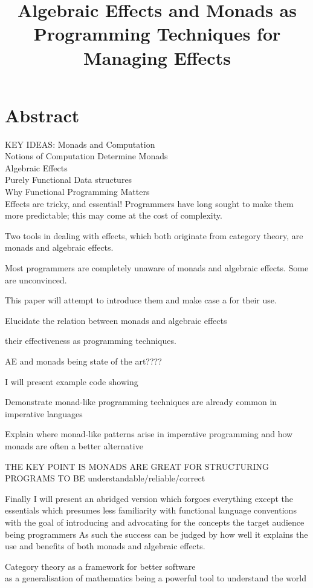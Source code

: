 \documentclass[a4paper,10pt]{article}
\title{Algebraic Effects and Monads as Programming Techniques for Managing Effects}
\theoremstyle{definition}
\begin{document}
\section{Abstract}

KEY IDEAS:
Monads and Computation\\
Notions of Computation Determine Monads\\
Algebraic Effects\\
Purely Functional Data structures\\
Why Functional Programming Matters\\

Effects are tricky, and essential!
Programmers have long sought to make them more predictable;
this may come at the cost of complexity.

Two tools in dealing with effects, which both originate from category theory,
are monads and algebraic effects.

Most programmers are completely unaware of monads and algebraic effects.
Some are unconvinced.

This paper will attempt to introduce them and make case a for their use.

Elucidate the relation between monads and algebraic effects

their effectiveness as programming techniques.

AE and monads being state of the art????

I will present example code showing

Demonstrate monad-like programming techniques are already common in imperative languages

Explain where monad-like patterns arise in imperative programming and how monads are often a better alternative

THE KEY POINT IS MONADS ARE GREAT FOR STRUCTURING PROGRAMS TO BE understandable/reliable/correct

Finally I will present an abridged version which forgoes everything except the essentials
which presumes less familiarity with functional language conventions
with the goal of introducing and advocating for the concepts
the target audience being programmers
As such the success can be judged by how well it explains the use and benefits of both monads and algebraic effects.

Category theory as a framework for better software\\
as a generalisation of mathematics being a powerful tool to understand the world\\
\end{document}
